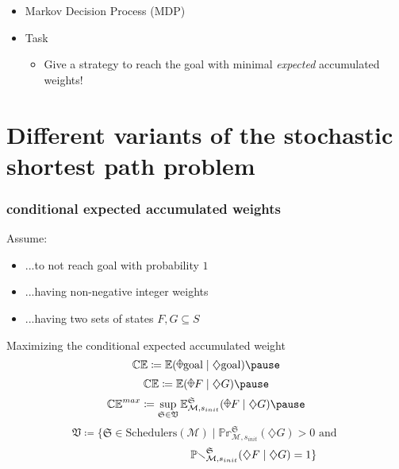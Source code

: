 \documentclass[onlymath]{beamer}
\begin{document}
\begin{frame}
\begin{itemize}
\begin{center}
	\end{center}
	\item Markov Decision Process (MDP)
	\item Task
	\begin{itemize}
		\item Give a strategy to reach the goal with minimal \textit{expected} accumulated weights!
	\end{itemize}
\end{itemize}
\end{frame}


\section{Different variants of the stochastic shortest path problem}

\begin{frame}
	\frametitle{conditional expected accumulated weights}
	Assume:
	\begin{itemize}
		\item ...to not reach goal with probability $1$ \pause
		\item ...having non-negative integer weights \pause
		\item ...having two sets of states $F,G \subseteq S$ \pause
	\end{itemize}
	\begin{block}{Maximizing the conditional expected accumulated weight}
		\[
			\mathbb{CE} \coloneqq \mathbb{E}(\rawdiaplus \mathrm{goal} \mid \diamondsuit \mathrm{goal}) \pause
		\] 
		\[
			\mathbb{CE} \coloneqq \mathbb{E}(\rawdiaplus F \mid \diamondsuit G) \pause
		\] 
		\[
			\mathbb{CE}^{max} \coloneqq \sup_{\mathfrak{S} \in \mathfrak{V}}\mathbb{E}_{\mathcal{M},s_{init}}^{\mathfrak{S}}(\rawdiaplus F \mid \diamondsuit G) \pause
		\] 
		\[
			\mathfrak{V} \coloneqq \{\mathfrak{S} \in \mathrm{Schedulers}(\mathcal{M}) \mid \mathbb{Pr}_{\mathcal{M},s_{init}}^{\mathfrak{S}}(\diamondsuit G) > 0 \text{ and } \]\[ \hspace{20ex} \mathbb{Pr}_{\mathcal{M},s_{init}}^{\mathfrak{S}}(\diamondsuit F \mid \diamondsuit G) = 1 \}
		\]		
	\end{block}
\end{frame}
\end{document}
